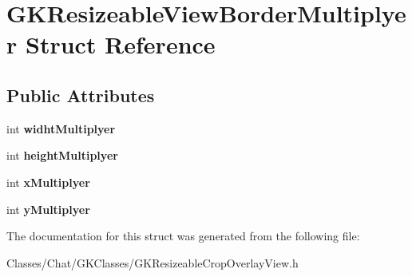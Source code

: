 \hypertarget{struct_g_k_resizeable_view_border_multiplyer}{}\section{G\+K\+Resizeable\+View\+Border\+Multiplyer Struct Reference}
\label{struct_g_k_resizeable_view_border_multiplyer}
\subsection*{Public Attributes}
\begin{DoxyCompactItemize}
\item 
\hypertarget{struct_g_k_resizeable_view_border_multiplyer_ab0d6db8bcb74e5bdd13c4152c3ed1633}{}int {\bfseries widht\+Multiplyer}\label{struct_g_k_resizeable_view_border_multiplyer_ab0d6db8bcb74e5bdd13c4152c3ed1633}

\item 
\hypertarget{struct_g_k_resizeable_view_border_multiplyer_a2e9dfec1e03e90e4184e310264ca86aa}{}int {\bfseries height\+Multiplyer}\label{struct_g_k_resizeable_view_border_multiplyer_a2e9dfec1e03e90e4184e310264ca86aa}

\item 
\hypertarget{struct_g_k_resizeable_view_border_multiplyer_aa8961a45afcc5aa183b146fe1cd032bf}{}int {\bfseries x\+Multiplyer}\label{struct_g_k_resizeable_view_border_multiplyer_aa8961a45afcc5aa183b146fe1cd032bf}

\item 
\hypertarget{struct_g_k_resizeable_view_border_multiplyer_aa96ec44d34ecb84500b349eacb86a44b}{}int {\bfseries y\+Multiplyer}\label{struct_g_k_resizeable_view_border_multiplyer_aa96ec44d34ecb84500b349eacb86a44b}

\end{DoxyCompactItemize}


The documentation for this struct was generated from the following file\+:\begin{DoxyCompactItemize}
\item 
Classes/\+Chat/\+G\+K\+Classes/G\+K\+Resizeable\+Crop\+Overlay\+View.\+h\end{DoxyCompactItemize}
